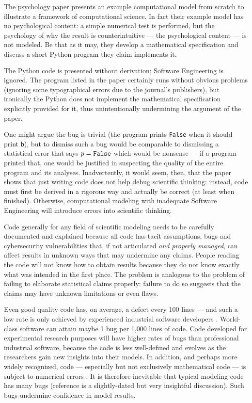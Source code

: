 \documentclass{comjnl}
\begin{document}
The psychology paper \cite{psychological-modeling} presents an example computational model from scratch to illustrate a framework of computational science. In fact their example model has no psychological content: a simple numerical test is performed, but the psychology of why the result is counterintuitive --- the psychological content --- is not modeled. Be that as it may, they develop a mathematical specification and discuss a short Python program they claim implements it. 

The Python code is presented without derivation; Software Engineering is ignored. The program listed in the paper certainly runs without obvious problems (ignoring some typographical errors due to the journal's publishers), but ironically the Python does not implement the mathematical specification explicitly provided for it, thus unintentionally undermining the argument of the paper. 

One might argue the bug is trivial (the program prints \texttt{False} when it should print \texttt{b}), but to dismiss such a bug would be comparable to dismissing a statistical error that says $p=\mbox{\tt False}$ which would be nonsense --- if a program printed that, one would be justified in suspecting the quality of the entire program and its analyses. Inadvertently, it would seem, then, that the paper shows that just writing code does not help debug scientific thinking: instead, code must first be derived in a rigorous way and actually be correct (at least when finished). Otherwise, computational modeling with inadequate Software Engineering will introduce errors into scientific thinking.

Code generally for any field of scientific modeling needs to be carefully documented and explained because all code has tacit assumptions, bugs and cybersecurity vulnerabilities \cite{Ben,nature-review,se-bias} that, if not articulated \emph{and properly managed}, can affect results in unknown ways that may undermine any claims. People reading the code will not know how to obtain results because they do not know exactly what was intended in the first place. The problem is analogous to the problem of failing to elaborate statistical claims properly: failure to do so suggests that the claims may have unknown limitations or even  flaws.

Even good quality code has, on average, a defect every 100 lines --- and {such a low} rate is only achieved by experienced industrial software developers \cite{ourReview}. World-class software can attain maybe 1 bug per 1,000 lines of code. Code developed for experimental research purposes will have higher rates of bugs than professional industrial software, because the code is less well-defined and evolves as the researchers gain new insights into their models. In addition, and perhaps more widely recognized, code --- especially but not exclusively mathematical code --- is subject to numerical errors \cite{hamming}. It is therefore inevitable that typical modeling code has many bugs (reference \cite{NVP} is a slightly-dated but very insightful discussion). Such bugs undermine confidence in model results. 
\end{document}
